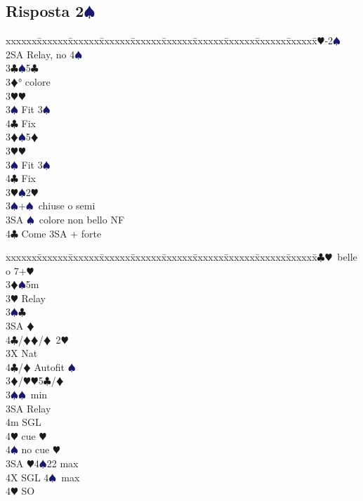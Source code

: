\documentclass[a4paper,italian]{article}
\newcommand{\BC}{\textcolor{OliveGreen}{$\clubsuit$}}
\newcommand{\BD}{\textcolor{RedOrange}{$\vardiamondsuit$}}
\newcommand{\BH}{\textcolor{Red2}{$\varheartsuit${}}}
\newcommand{\BS}{\textcolor{MidnightBlue}{$\spadesuit${}}}
\newcommand{\pdfs}{\texorpdfstring{\BS{}}{S}}
\newenvironment{bidtable}
{\begin{tabbing}

    xxxxxx\=xxxxxx\=xxxxxx\=xxxxxx\=xxxxxx\=xxxxxx\=xxxxxx\=xxxxxx\=xxxxxx\=xxxxxx\=\kill}
{\end{tabbing} }%
\begin{document}
\newpage

\subsection{Risposta 2\pdfs}

\begin{multicols}{2}
    \begin{bidtable}
        1\BH-2\BS\+\\
        2SA \> Relay, no 4\BS \+\\
        3\BC {}\BS 5\BC \+\\
        3\BD {}° colore\\
        3\BH {}\BH \\
        3\BS \> Fit 3\BS \\
        4\BC \> Fix\-\\
        3\BD {}\BS 5\BD \+\\
        3\BH {}\BH \\
        3\BS \> Fit 3\BS \\
        4\BC \> Fix\-\\
        3\BH {}\BS 2\BH \\
        3\BS {}+\BS\ chiuse o semi\\
        3SA \BS\ colore non bello NF\\
        4\BC \> Come 3SA + forte\\
    \end{bidtable}
    \columnbreak
    \begin{bidtable}
        3\BC {}\BH\ belle o 7+\BH \+\\
        3\BD {}\BS 5m\+\\
        3\BH \> Relay\+\\
        3\BS {}\BC \\
        3SA \BD \\
        4\BC/\BD {}\BD /\BD\ 2\BH \-\-\\
        3X \> Nat\\
        4\BC/\BD \> Autofit \BS \-\\
        3\BD/\BH {}\BH 5\BC /\BD \\
        3\BS {}\BS\ min\+\\
        3SA \> Relay\+\\
        4m \> SGL\\
        4\BH {} cue \BH \\
        4\BS {} no cue \BH \-\-\\
        3SA \BH 4\BS 22 max\\
        4X \> SGL 4\BS\ max\\
        4\BH \> SO
    \end{bidtable}
\end{multicols}
\end{document}
